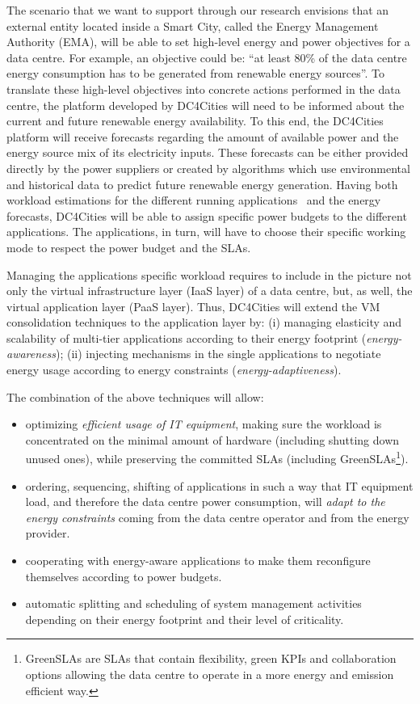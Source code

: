 \documentclass[conference]{IEEEtran}
\begin{document}
The scenario that we want to support through our research envisions that an external entity located inside a Smart City, called the Energy Management Authority (EMA), will be able to set high-level energy and power objectives for a data centre.
For example, an objective could be: \enquote{at least 80\% of the data centre energy consumption has to be generated from renewable energy sources}.
To translate these high-level objectives into concrete actions performed in the data centre, the platform developed by DC4Cities will need to be informed about the current and future renewable energy availability.
To this end, the DC4Cities platform will receive forecasts regarding the amount of available power and the energy source mix of its electricity inputs.
These forecasts can be either provided directly by the power suppliers or created by algorithms which use environmental and historical data to predict future renewable energy generation.
Having both workload estimations for the different running applications~\cite{Kansal2008} and the energy forecasts, DC4Cities will be able to assign specific power budgets to the different applications.
The applications, in turn, will have to choose their specific working mode to respect the power budget and the SLAs.

Managing the applications specific workload requires to include in the picture not only the virtual infrastructure layer (IaaS layer) of a data centre, but, as well, the virtual application layer (PaaS layer).
Thus, DC4Cities will extend the VM consolidation techniques to the application layer by: (i) managing elasticity and scalability of multi-tier applications according to their energy footprint (\emph{energy-awareness}); (ii) injecting mechanisms in the single applications to negotiate energy usage according to energy constraints (\emph{energy-adaptiveness}).

The combination of the above techniques will allow:
\begin{itemize}
  \item optimizing \emph{efficient usage of IT equipment}, making sure the workload is concentrated on the minimal amount of hardware (including shutting down unused ones), while preserving the committed SLAs (including GreenSLAs\footnote{GreenSLAs are SLAs that contain flexibility, green KPIs and collaboration options allowing the data centre to operate in a more energy and emission efficient way.}).
  \item ordering, sequencing, shifting of applications in such a way that IT equipment load, and therefore the data centre power consumption, will \emph{adapt to the energy constraints} coming from the data centre operator and from the energy provider.
  \item cooperating with energy-aware applications to make them reconfigure themselves according to power budgets.
  \item automatic splitting and scheduling of system management activities depending on their energy footprint and their level of criticality.
\end{itemize}
\end{document}
